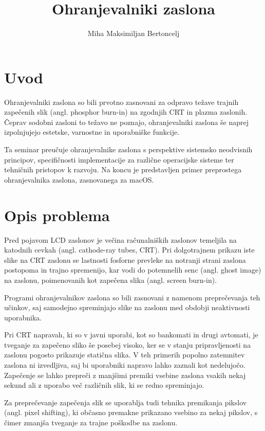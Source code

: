 \documentclass[11pt, oneside]{article}   	%
\title{Ohranjevalniki zaslona}
\author{Miha Maksimiljan Bertoncelj}
\begin{document}
\tableofcontents
\maketitle

\section{Uvod}
Ohranjevalniki zaslona so bili prvotno zasnovani za odpravo težave trajnih zapečenih slik (angl. phosphor burn-in) na zgodnjih CRT in plazma zaslonih. Čeprav sodobni zasloni to težavo ne poznajo, ohranjevalniki zaslona še naprej izpolnjujejo estetske, varnostne in uporabniške funkcije.

Ta seminar preučuje ohranjevalnike zaslona s perspektive sistemsko neodvisnih principov, specifičnosti implementacije za različne operacijske sisteme ter tehničnih pristopov k razvoju. Na koncu je predstavljen primer preprostega ohranjevalnika zaslona, zasnovanega za macOS.

\section{Opis problema}
Pred pojavom LCD zaslonov je večina računalniških zaslonov temeljila na katodnih cevkah (angl. cathode-ray tubes, CRT). Pri dolgotrajnem prikazu iste slike na CRT zaslonu se lastnosti fosforne prevleke na notranji strani zaslona postopoma in trajno spremenijo, kar vodi do potemnelih senc (angl. ghost image) na zaslonu, poimenovanih kot zapečena slika (angl. screen burn-in). 

Programi ohranjevalnikov zaslona so bili zasnovani z namenom preprečevanja teh učinkov, saj samodejno spreminjajo slike na zaslonu med obdobji neaktivnosti uporabnika.

Pri CRT napravah, ki so v javni uporabi, kot so bankomati in drugi avtomati, je tveganje za zapečeno sliko še posebej visoko, ker se v stanju pripravljenosti na zaslonu pogosto prikazuje statična slika. V teh primerih popolno zatemnitev zaslona ni izvedljiva, saj bi uporabniki napravo lahko zaznali kot nedelujočo. Zapečenje se lahko prepreči z manjšimi premiki vsebine zaslona vsakih nekaj sekund ali z uporabo več različnih slik, ki se redno spreminjajo.

Za preprečevanje zapečenja slik se uporablja tudi tehnika premikanja pikslov (angl. pixel shifting), ki občasno premakne prikazano vsebino za nekaj pikslov, s čimer zmanjša tveganje za trajne poškodbe na zaslonu.
\end{document}
